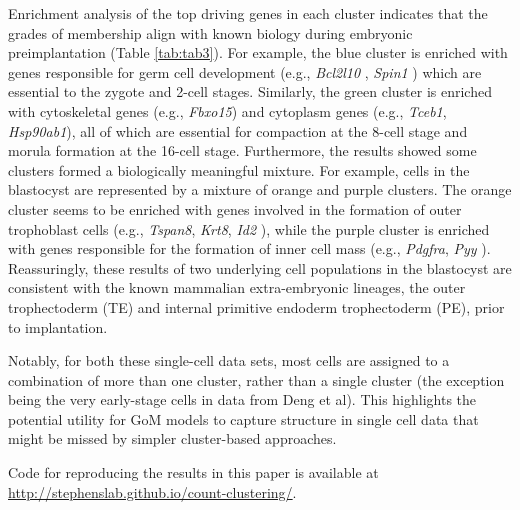 Enrichment analysis of the top driving genes in each cluster indicates that the grades of membership align with known biology during embryonic preimplantation (Table \ref{tab:tab3}). For example, the blue cluster is enriched with genes responsible for germ cell development (e.g., \textit{Bcl2l10} \cite{Yoon2009}, \textit{Spin1} \cite{Evsikov2009}) which are essential to the zygote and 2-cell stages. Similarly, the green cluster is enriched with cytoskeletal genes (e.g., \textit{Fbxo15}) and cytoplasm genes (e.g., \textit{Tceb1}, \textit{Hsp90ab1}), all of which are essential for compaction at the 8-cell stage and morula formation at the 16-cell stage. Furthermore, the results showed some clusters formed a biologically meaningful mixture. For example, cells in the blastocyst are represented by a mixture of orange and purple clusters. The orange cluster seems to be  enriched with genes involved in the formation of outer trophoblast cells (e.g., \textit{Tspan8}, \textit{Krt8}, \textit{Id2} \cite{Guo2010}), while the purple cluster is enriched with genes responsible for the formation of inner cell mass (e.g., \textit{Pdgfra}, \textit{Pyy} \cite{Hou2007}). Reassuringly, these results of two underlying cell populations in the blastocyst are consistent with the known mammalian extra-embryonic lineages, the outer trophectoderm (TE) and internal primitive endoderm trophectoderm (PE), prior to implantation.


Notably, for both these single-cell data sets, most cells are assigned to a combination of more than one cluster, rather than a single cluster (the exception being the very early-stage cells in data from Deng et al). This highlights the potential utility for GoM models to capture structure in single cell data that might be missed by simpler cluster-based approaches.

Code for reproducing the results in this paper is available at \url{http://stephenslab.github.io/count-clustering/}.





